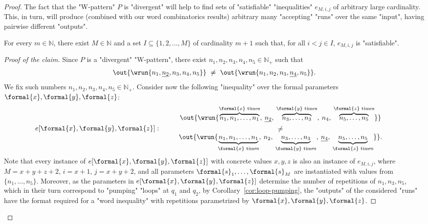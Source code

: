 \documentclass{theoretics}
\begin{document}
\begin{proof}
The fact that the "W-pattern" $P$ is "divergent" will help to find sets
of "satisfiable" "inequalities" $e_{M,i,j}$ of arbitrary large
cardinality. This, in turn, will produce (combined with our word
combinatorics results) arbitrary many "accepting" "runs" 
over the 
same "input", having pairwise different "outputs".


\begin{claim*}
    For every $m \in \mathbb{N}$, there exist $M \in \mathbb{N}$ and a set $I \subseteq \{1,2,\ldots,M\}$ 
    of cardinality $m + 1$ such that, for all $i<j\in I$, $e_{M,i,j}$ is "satisfiable".
\end{claim*}

\begin{proof}[Proof of the claim]
Since $P$ is a "divergent" "W-pattern", there exist
$n_1,n_2,n_3,n_4,n_5 \in \mathbb{N}_+$ such that
\[
  \out{\wrun{n_1,\underline{n_2},n_3,n_4,n_5}}
  ~\neq~
  \out{\wrun{n_1,n_2,n_3,\underline{n_4},n_5}}. 
\]
We fix such numbers $n_1,n_2,n_3,n_4,n_5 \in \mathbb{N}_+$.
Consider now the following "inequality" over the formal parameters 
$\formal{x}, \formal{y}, \formal{z}$:
\begin{align*}
    &e[\formal{x}, \formal{y}, \formal{z}]: %
    \quad\left.
    \begin{array}{ccc}
         & \out{\wrun{
         \overbrace{n_1,n_1,\ldots,n_1}^{\formal{x} \textup{ times}}, \: \underline{n_2}, \:
         \overbrace{n_3,\ldots,n_3}^{\formal{y} \textup{ times}}, \: n_4, \:
         \overbrace{n_5,\ldots,n_5}^{\formal{z} \textup{ times}}}}\\[1ex]
         & \neq\\
         & \out{\wrun{
         \underbrace{n_1,n_1,\ldots,n_1}_{\formal{x} \textup{ times}}, \: n_2, \:
         \underbrace{n_3,\ldots,n_3}_{\formal{y} \textup{ times}}, \: \underline{n_4}, \:
         \underbrace{n_5,\ldots,n_5}_{\formal{z} \textup{ times}}}}.
    \end{array}
    \right.
\end{align*}
Note that every instance of $e[\formal{x}, \formal{y}, \formal{z}]$ 
with concrete values $x,y,z$ is also an instance of $e_{M,i,j}$, where 
$M=x+y+z+2$, $i=x+1$, $j=x+y+2$, and all parameters 
$\formal{s}_1, \ldots, \formal{s}_M$ are instantiated with values from $\{n_1, \ldots, n_5\}$. 
Moreover, as the parameters in $e[\formal{x}, \formal{y}, \formal{z}]$ determine the number of 
repetitions of $n_1,n_3,n_5$, which in their turn correspond to "pumping" 
"loops" at $q_1$ and $q_2$,
by Corollary~\ref{cor:loop-pumping}, the "outputs" of the considered "runs" 
have the format required for a "word inequality" with repetitions 
parametrized by $\formal{x}, \formal{y}, \formal{z}$.


\end{proof}
\end{proof}
\end{document}
